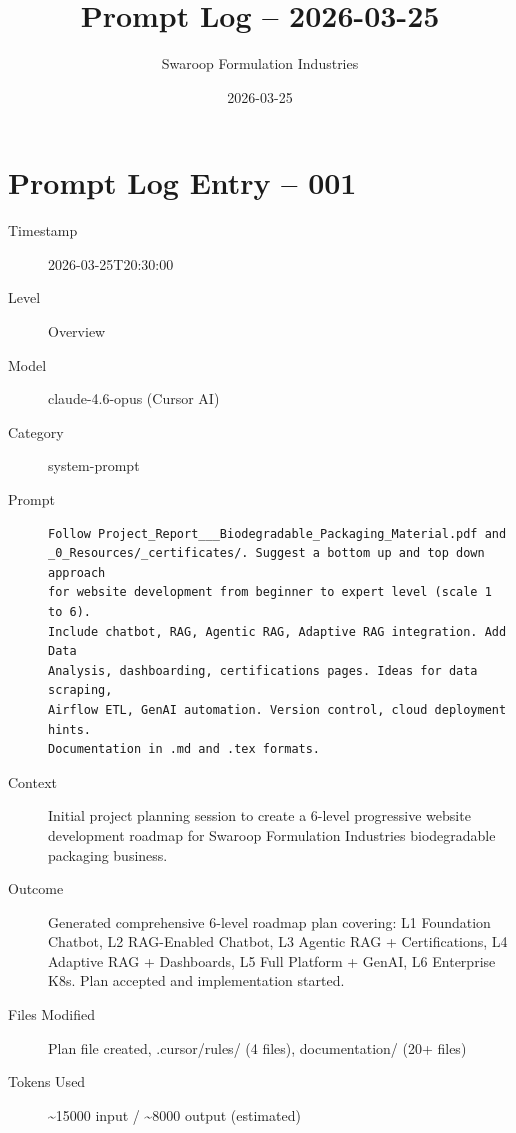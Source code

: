 \documentclass[12pt,a4paper]{article}
\title{Prompt Log -- 2026-03-25}
\author{Swaroop Formulation Industries}
\date{2026-03-25}
\begin{document}
\maketitle

\section{Prompt Log Entry -- 001}

\begin{description}
  \item[Timestamp] 2026-03-25T20:30:00
  \item[Level] Overview
  \item[Model] claude-4.6-opus (Cursor AI)
  \item[Category] system-prompt
  \item[Prompt] \begin{lstlisting}
Follow Project_Report___Biodegradable_Packaging_Material.pdf and
_0_Resources/_certificates/. Suggest a bottom up and top down approach
for website development from beginner to expert level (scale 1 to 6).
Include chatbot, RAG, Agentic RAG, Adaptive RAG integration. Add Data
Analysis, dashboarding, certifications pages. Ideas for data scraping,
Airflow ETL, GenAI automation. Version control, cloud deployment hints.
Documentation in .md and .tex formats.
  \end{lstlisting}
  \item[Context] Initial project planning session to create a 6-level progressive website development roadmap for Swaroop Formulation Industries biodegradable packaging business.
  \item[Outcome] Generated comprehensive 6-level roadmap plan covering: L1 Foundation Chatbot, L2 RAG-Enabled Chatbot, L3 Agentic RAG + Certifications, L4 Adaptive RAG + Dashboards, L5 Full Platform + GenAI, L6 Enterprise K8s. Plan accepted and implementation started.
  \item[Files Modified] Plan file created, .cursor/rules/ (4 files), documentation/ (20+ files)
  \item[Tokens Used] \textasciitilde{}15000 input / \textasciitilde{}8000 output (estimated)
\end{description}
\end{document}
